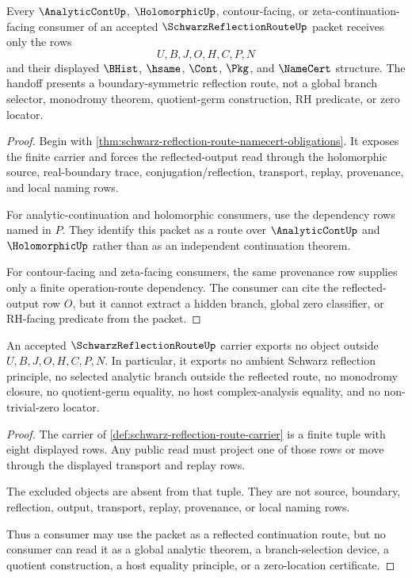 \begin{theorem}
\label{thm:schwarz-reflection-route-public-handoff}
Every $\AnalyticContUp$, $\HolomorphicUp$, contour-facing, or zeta-continuation-facing consumer of an accepted $\SchwarzReflectionRouteUp$ packet receives only the rows
$$
U,B,J,O,H,C,P,N
$$
and their displayed $\BHist$, $\hsame$, $\Cont$, $\Pkg$, and $\NameCert$ structure. The handoff presents a boundary-symmetric reflection route, not a global branch selector, monodromy theorem, quotient-germ construction, RH predicate, or zero locator.
\end{theorem}
\begin{proof}
Begin with \autoref{thm:schwarz-reflection-route-namecert-obligations}. It exposes the finite carrier and forces the reflected-output read through the holomorphic source, real-boundary trace, conjugation/reflection, transport, replay, provenance, and local naming rows.

For analytic-continuation and holomorphic consumers, use the dependency rows named in $P$. They identify this packet as a route over $\AnalyticContUp$ and $\HolomorphicUp$ rather than as an independent continuation theorem.

For contour-facing and zeta-facing consumers, the same provenance row supplies only a finite operation-route dependency. The consumer can cite the reflected-output row $O$, but it cannot extract a hidden branch, global zero classifier, or RH-facing predicate from the packet.
\end{proof}

\begin{theorem}
\label{thm:schwarz-reflection-route-nonescape}
An accepted $\SchwarzReflectionRouteUp$ carrier exports no object outside $U,B,J,O,H,C,P,N$. In particular, it exports no ambient Schwarz reflection principle, no selected analytic branch outside the reflected route, no monodromy closure, no quotient-germ equality, no host complex-analysis equality, and no non-trivial-zero locator.
\end{theorem}
\begin{proof}
The carrier of \autoref{def:schwarz-reflection-route-carrier} is a finite tuple with eight displayed rows. Any public read must project one of those rows or move through the displayed transport and replay rows.

The excluded objects are absent from that tuple. They are not source, boundary, reflection, output, transport, replay, provenance, or local naming rows.

Thus a consumer may use the packet as a reflected continuation route, but no consumer can read it as a global analytic theorem, a branch-selection device, a quotient construction, a host equality principle, or a zero-location certificate.
\end{proof}

